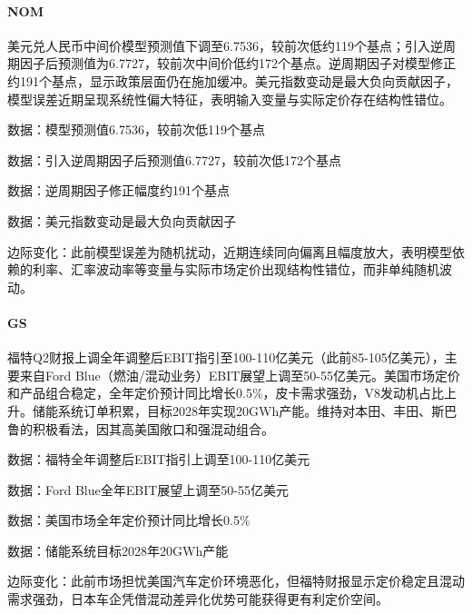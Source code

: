 \documentclass[11pt]{ctexart}
\begin{document}
\paragraph{NOM} 美元兑人民币中间价模型预测值下调至6.7536，较前次低约119个基点；引入逆周期因子后预测值为6.7727，较前次中间价低约172个基点。逆周期因子对模型修正约191个基点，显示政策层面仍在施加缓冲。美元指数变动是最大负向贡献因子，模型误差近期呈现系统性偏大特征，表明输入变量与实际定价存在结构性错位。
{\small\color{refgray}数据：模型预测值6.7536，较前次低119个基点\par}
{\small\color{refgray}数据：引入逆周期因子后预测值6.7727，较前次低172个基点\par}
{\small\color{refgray}数据：逆周期因子修正幅度约191个基点\par}
{\small\color{refgray}数据：美元指数变动是最大负向贡献因子\par}
{\small\color{refgray}边际变化：此前模型误差为随机扰动，近期连续同向偏离且幅度放大，表明模型依赖的利率、汇率波动率等变量与实际市场定价出现结构性错位，而非单纯随机波动。\par}
\paragraph{GS} 福特Q2财报上调全年调整后EBIT指引至100-110亿美元（此前85-105亿美元），主要来自Ford Blue（燃油/混动业务）EBIT展望上调至50-55亿美元。美国市场定价和产品组合稳定，全年定价预计同比增长0.5\%，皮卡需求强劲，V8发动机占比上升。储能系统订单积累，目标2028年实现20GWh产能。维持对本田、丰田、斯巴鲁的积极看法，因其高美国敞口和强混动组合。
{\small\color{refgray}数据：福特全年调整后EBIT指引上调至100-110亿美元\par}
{\small\color{refgray}数据：Ford Blue全年EBIT展望上调至50-55亿美元\par}
{\small\color{refgray}数据：美国市场全年定价预计同比增长0.5\%\par}
{\small\color{refgray}数据：储能系统目标2028年20GWh产能\par}
{\small\color{refgray}边际变化：此前市场担忧美国汽车定价环境恶化，但福特财报显示定价稳定且混动需求强劲，日本车企凭借混动差异化优势可能获得更有利定价空间。\par}
\end{document}
